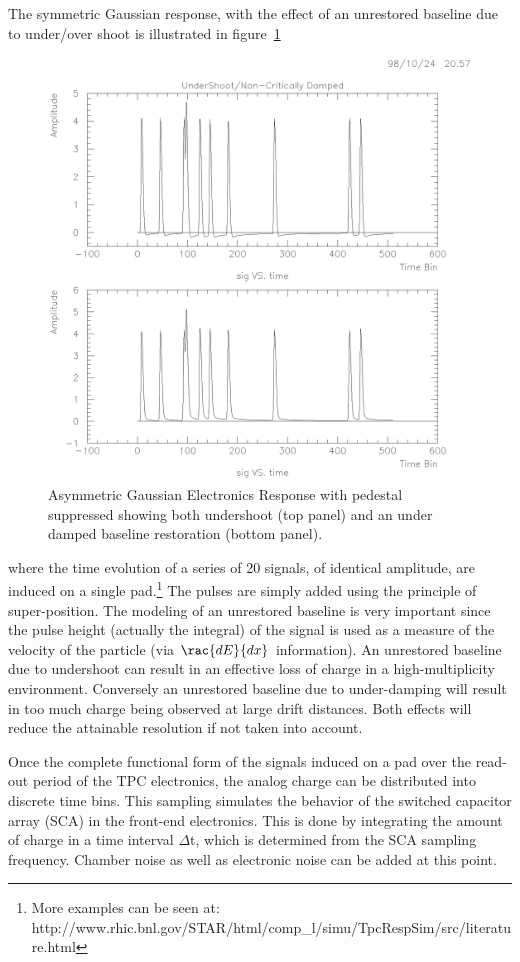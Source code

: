 \documentclass[twoside]{article}
\begin{document}
The symmetric Gaussian response, with the effect of an unrestored baseline
due to under/over shoot is illustrated in figure~\ref{fig:baseline}
\begin{figure}[htb]
\begin{center}
\includegraphics[bbllx=14pt,bblly=137pt,bburx=569pt,bbury=701pt,width=.55\textwidth]{./pics/baseline.ps}
\caption{Asymmetric Gaussian Electronics Response with pedestal suppressed
  showing both undershoot (top panel) and an under damped
  baseline restoration (bottom panel).}
\label{fig:baseline}
\end{center}
\end{figure}
where the time evolution of a series of 20 signals, of identical
amplitude, are induced on a single pad.\footnote{More examples can
  be seen at: http://www.rhic.bnl.gov/STAR/html/comp\_l/simu/TpcRespSim/src/literature.html} 
The pulses are simply added using the principle of super-position.
The modeling of an unrestored baseline is very
important since the pulse height (actually the integral) of the
signal is used as a measure of the velocity of the particle (via $\rac{dE}{dx}$
information).  An unrestored baseline due to undershoot can result in
an effective loss of charge in a high-multiplicity environment.  Conversely
an unrestored baseline due to under-damping will result in too much
charge being observed at large drift distances.  Both effects
will reduce the attainable resolution if not taken into account.  

Once the complete functional form of the signals induced on a pad
over the read-out period of the TPC electronics, the analog charge
can be distributed into discrete time bins. This sampling simulates
the behavior of the switched capacitor array (SCA) in the front-end
electronics.  This is done by integrating the amount of charge in
a time interval $\Delta$t, which is determined from the SCA sampling
frequency.  Chamber noise as well as electronic noise
can be added at this point.
\end{document}

